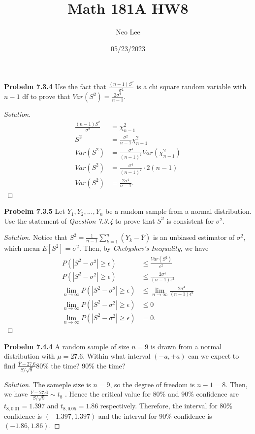 \documentclass{article}
\title{Math 181A HW8}
\author{Neo Lee}
\date{05/23/2023}
\begin{document}
 

\maketitle 

\textbf{Probelm 7.3.4} 
Use the fact that $\frac{(n-1)S^2}{\sigma^2}$ is a chi square random variable with $n - 1$ df to prove that
$Var(S^2) = \frac{2\sigma^4}{n-1}$.
\begin{proof}[Solution]
    \begin{align*}
        \frac{(n-1)S^2}{\sigma^2} & = \chi^2_{n-1} \\
        S^2 & = \frac{\sigma^2}{n-1}\chi^2_{n-1} \\
        Var(S^2) & = \frac{\sigma^4}{(n-1)^2}Var(\chi^2_{n-1}) \\
        Var(S^2) & = \frac{\sigma^4}{(n-1)^2}\cdot2(n-1) \\
        Var(S^2) & = \frac{2\sigma^4}{n-1}.
    \end{align*}
\end{proof}
\bigbreak


\textbf{Probelm 7.3.5}
Let $Y_1,Y_2,...,Y_n$ be a random sample from a normal distribution. 
Use the statement of \emph{Question 7.3.4} to prove that $S^2$ is consistent for $\sigma^2$.
\begin{proof}[Solution]
    Notice that $S^2 = \frac{1}{n-1}\sum_{k=1}^{n}(Y_k-\overline{Y})$ is an unbiased estimator of $\sigma^2$, which mean $E[S^2] = \sigma^2$.
    Then, by \emph{Chebyshev's Inequality}, we have
    \begin{align*}
        P(|S^2 - \sigma^2| \ge \epsilon) & \le \frac{Var(S^2)}{\epsilon^2} \\
        P(|S^2 - \sigma^2| \ge \epsilon) & \le \frac{2\sigma^4}{(n-1)\epsilon^2} \\
        \lim_{n\to\infty}P(|S^2 - \sigma^2| \ge \epsilon) & \le \lim_{n\to\infty}\frac{2\sigma^4}{(n-1)\epsilon^2} \\
        \lim_{n\to\infty}P(|S^2 - \sigma^2| \ge \epsilon) & \le 0 \\
        \lim_{n\to\infty}P(|S^2 - \sigma^2| \ge \epsilon) & = 0.
    \end{align*}
\end{proof}
\bigbreak


\textbf{Probelm 7.4.4}
A random sample of size $n = 9$ is drawn from a normal distribution with $\mu = 27.6$. 
Within what interval $(-a, +a)$ can we expect to find $\frac{\overline{Y}-27.6}{S/\sqrt{9}} 80\%$ the time? 90\% the time?
\begin{proof}[Solution]
    The sameple size is $n=9$, so the degree of freedom is $n-1=8$. 
    Then, we have $\frac{\overline{Y}-27.6}{S/\sqrt{9}} \sim t_8$ . Hence the critical value for 80\% and 90\% confidence are $t_{8, 0.01}= 1.397$ and $t_{8,0.05} = 1.86$ respectively.
    Therefore, the interval for 80\% confidence is $(-1.397, 1.397)$ and the interval for 90\% confidence is $(-1.86, 1.86)$.
\end{proof}
\end{document}
